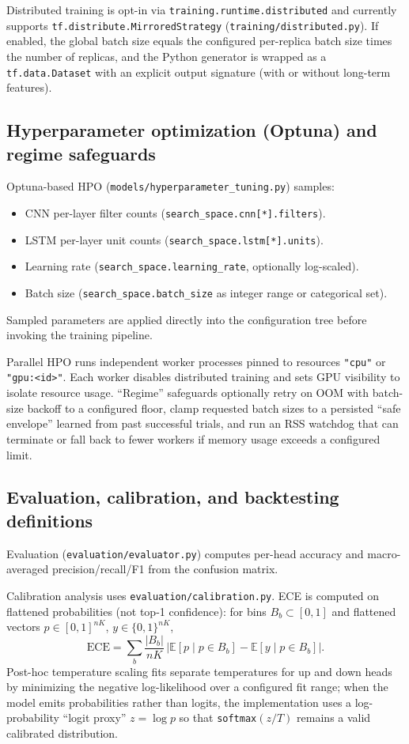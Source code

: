 \documentclass[11pt]{article}
\begin{document}
Distributed training is opt-in via \texttt{training.runtime.distributed} and currently supports \texttt{tf.distribute.MirroredStrategy} (\texttt{training/distributed.py}). If enabled, the global batch size equals the configured per-replica batch size times the number of replicas, and the Python generator is wrapped as a \texttt{tf.data.Dataset} with an explicit output signature (with or without long-term features).

\subsection{Hyperparameter optimization (Optuna) and regime safeguards}

Optuna-based HPO (\texttt{models/hyperparameter\_tuning.py}) samples:
\begin{itemize}
  \item CNN per-layer filter counts (\texttt{search\_space.cnn[*].filters}).
  \item LSTM per-layer unit counts (\texttt{search\_space.lstm[*].units}).
  \item Learning rate (\texttt{search\_space.learning\_rate}, optionally log-scaled).
  \item Batch size (\texttt{search\_space.batch\_size} as integer range or categorical set).
\end{itemize}
Sampled parameters are applied directly into the configuration tree before invoking the training pipeline.

Parallel HPO runs independent worker processes pinned to resources \texttt{"cpu"} or \texttt{"gpu:<id>"}. Each worker disables distributed training and sets GPU visibility to isolate resource usage. ``Regime'' safeguards optionally retry on OOM with batch-size backoff to a configured floor, clamp requested batch sizes to a persisted ``safe envelope'' learned from past successful trials, and run an RSS watchdog that can terminate or fall back to fewer workers if memory usage exceeds a configured limit.

\subsection{Evaluation, calibration, and backtesting definitions}

Evaluation (\texttt{evaluation/evaluator.py}) computes per-head accuracy and macro-averaged precision/recall/F1 from the confusion matrix.

Calibration analysis uses \texttt{evaluation/calibration.py}. ECE is computed on flattened probabilities (not top-1 confidence): for bins $B_b\subset[0,1]$ and flattened vectors $p\in[0,1]^{nK}$, $y\in\{0,1\}^{nK}$,
\begin{equation}
  \mathrm{ECE} = \sum_{b} \frac{|B_b|}{nK}\,\bigl|\mathbb{E}[p\mid p\in B_b] - \mathbb{E}[y\mid p\in B_b]\bigr|.
\end{equation}
Post-hoc temperature scaling fits separate temperatures for up and down heads by minimizing the negative log-likelihood over a configured fit range; when the model emits probabilities rather than logits, the implementation uses a log-probability ``logit proxy'' $z=\log p$ so that \texttt{softmax}$(z/T)$ remains a valid calibrated distribution.
\end{document}
